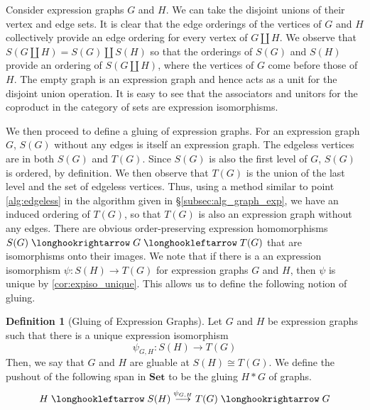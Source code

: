\documentclass{amsart}
\renewcommand{\to}[1][]{\stackrel{#1}{\longrightarrow}}
\newcommand{\hto}[1][]{\stackrel{#1}{\longhookrightarrow}}
\newcommand{\hot}[1][]{\stackrel{#1}{\longhookleftarrow}}
\newcommand{\Set}{\textbf{Set}}
\numberwithin{thm}{section}
\theoremstyle{definition}
\newtheorem{defn}[thm]{Definition}
\begin{document}
Consider expression graphs $G$ and $H$. We can take the disjoint unions of their
vertex and edge sets. It is clear that the edge orderings of the vertices of
$G$ and $H$ collectively provide an edge ordering for every vertex of
$G \amalg H$. We observe that $S(G \amalg H) = S(G) \amalg S(H)$ so that the
orderings of $S(G)$ and $S(H)$ provide an ordering of $S(G \amalg H)$, where the
vertices of $G$ come before those of $H$. The empty graph is an expression graph
and hence acts as a unit for the disjoint union operation. It is easy to see
that the associators and unitors for the coproduct in the category of sets are
expression isomorphisms.

We then proceed to define a gluing of expression graphs. For an expression
graph $G$, $S(G)$ without any edges is itself an expression graph.
The edgeless vertices are in both $S(G)$ and $T(G)$. Since $S(G)$ is also the
first level of $G$, $S(G)$ is ordered, by definition. We then observe that
$T(G)$ is the union of the last level and the set of edgeless vertices. Thus,
using a method similar to point \ref{alg:edgeless} in the algorithm given in
\S\ref{subsec:alg_graph_exp}, we have an induced ordering of $T(G)$, so that
$T(G)$ is also an expression graph without any edges.
There are obvious order-preserving expression homomorphisms
$S(G) \hto G \hot T(G)$ that are isomorphisms onto their images. We note
that if there is a an expression isomorphism $\psi : S(H) \to T(G)$ for
expression graphs $G$ and $H$, then $\psi$ is unique by \ref{cor:expiso_unique}.
This allows us to define the following notion of gluing.

\begin{defn}[Gluing of Expression Graphs]
Let $G$ and $H$ be expression graphs such that there is a unique expression
isomorphism
\[
  \psi_{G, H} : S(H) \to T(G)
\]
Then, we say that $G$ and $H$ are gluable at $S(H) \cong T(G)$. We define the
pushout of the following span in $\Set$ to be the gluing $H * G$ of graphs.
\[
  H \hot S(H) \to[\psi_{G, H}] T(G) \hto G
\]
\end{defn}
\end{document}
